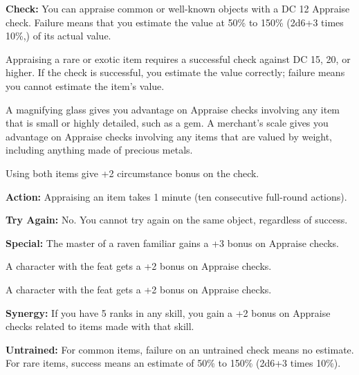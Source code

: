 \textbf{Check:} You can appraise common or well-known objects with a DC 12 Appraise check. Failure means that you estimate the value at 50\% to 150\% (2d6+3 times 10\%,) of its actual value.

Appraising a rare or exotic item requires a successful check against DC 15, 20, or higher. If the check is successful, you estimate the value correctly; failure means you cannot estimate the item's value.

A magnifying glass gives you advantage on Appraise checks involving any item that is small or highly detailed, such as a gem. A merchant's scale gives you advantage on Appraise checks involving any items that are valued by weight, including anything made of precious metals.

Using both items give +2 circumstance bonus on the check.

\textbf{Action:} Appraising an item takes 1 minute (ten consecutive full-round actions).

\textbf{Try Again:} No. You cannot try again on the same object, regardless of success.

\textbf{Special:} The master of a raven familiar gains a +3 bonus on Appraise checks.

A character with the  feat gets a +2 bonus on Appraise checks.

A character with the  feat gets a +2 bonus on Appraise checks.

\textbf{Synergy:} If you have 5 ranks in any  skill, you gain a +2 bonus on Appraise checks related to items made with that  skill.

\textbf{Untrained:} For common items, failure on an untrained check means no estimate. For rare items, success means an estimate of 50\% to 150\% (2d6+3 times 10\%).